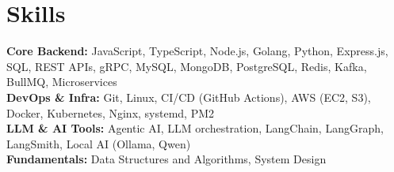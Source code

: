 \documentclass[]{resume-openfont-compact}
\newcommand{\resumeHeading}[4]{\runsubsection{\uppercase{#1}}\descript{ | #2}\hfill\location{#3 | #4}\fakeNewLine}
\begin{document}
\sectionsep



\section{Skills}
\begin{skillList}
    \textbf{Core Backend:} JavaScript, TypeScript, Node.js, Golang, Python, Express.js, SQL, REST APIs, gRPC, MySQL, MongoDB, PostgreSQL, Redis, Kafka, BullMQ, Microservices \\
    \textbf{DevOps \& Infra:} Git, Linux, CI/CD (GitHub Actions), AWS (EC2, S3), Docker, Kubernetes, Nginx, systemd, PM2 \\
    \textbf{LLM \& AI Tools:} Agentic AI, LLM orchestration, LangChain, LangGraph, LangSmith, Local AI (Ollama, Qwen) \\
    \textbf{Fundamentals:} Data Structures and Algorithms, System Design
\end{skillList}

\end{document}
